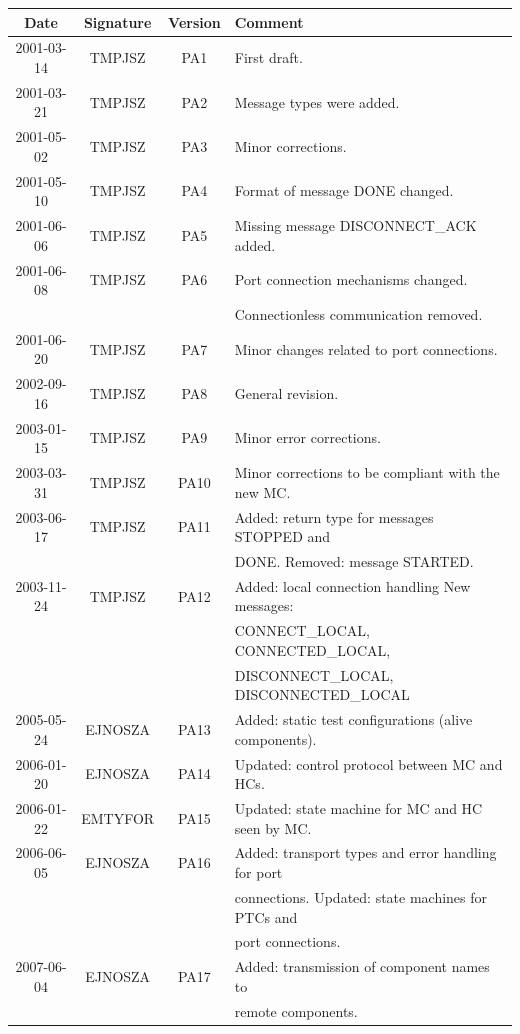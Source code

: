 \documentclass[a4paper,10pt]{article}
\begin{document}
\begin{tabular}{|c|c|c|l|}
\hline
Date & Signature & Version & Comment \\
\hline
2001-03-14 & TMPJSZ & PA1 & First draft. \\
\hline
2001-03-21 & TMPJSZ & PA2 & Message types were added. \\
\hline
2001-05-02 & TMPJSZ & PA3 & Minor corrections. \\
\hline
2001-05-10 & TMPJSZ & PA4 & Format of message DONE changed. \\
\hline
2001-06-06 & TMPJSZ & PA5 & Missing message DISCONNECT\_ACK added. \\
\hline
2001-06-08 & TMPJSZ & PA6 & Port connection mechanisms changed. \\
           &        &     & Connectionless communication removed. \\
\hline
2001-06-20 & TMPJSZ & PA7 & Minor changes related to port connections. \\
\hline
2002-09-16 & TMPJSZ & PA8 & General revision. \\
\hline
2003-01-15 & TMPJSZ & PA9 & Minor error corrections. \\
\hline
2003-03-31 & TMPJSZ & PA10 & Minor corrections to be compliant with the new MC. \\
\hline
2003-06-17 & TMPJSZ & PA11 & Added: return type for messages STOPPED and \\
           &        &      & DONE. Removed: message STARTED. \\
\hline
2003-11-24 & TMPJSZ & PA12 & Added: local connection handling New messages: \\
           &        &      & CONNECT\_LOCAL, CONNECTED\_LOCAL, \\
           &        &      & DISCONNECT\_LOCAL, DISCONNECTED\_LOCAL \\
\hline
2005-05-24 & EJNOSZA & PA13 & Added: static test configurations (alive components). \\
\hline
2006-01-20 & EJNOSZA & PA14 & Updated: control protocol between MC and HCs. \\
\hline
2006-01-22 & EMTYFOR & PA15 & Updated: state machine for MC and HC seen by MC. \\
\hline
2006-06-05 & EJNOSZA & PA16 & Added: transport types and error handling for port \\
           &         &      & connections. Updated: state machines for PTCs and \\
           &         &      & port connections. \\
\hline
2007-06-04 & EJNOSZA & PA17 & Added: transmission of component names to \\
           &         &      & remote components. \\
\hline
\end{tabular}
\end{document}
